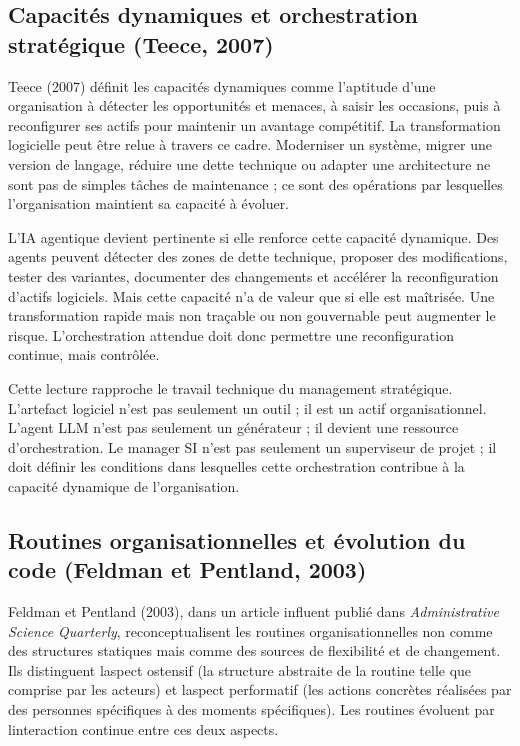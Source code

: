 \subsection{Capacit\'es dynamiques et orchestration strat\'egique (Teece, 2007)}

Teece (2007) définit les capacités dynamiques comme l'aptitude d'une organisation à détecter les opportunités et menaces, à saisir les occasions, puis à reconfigurer ses actifs pour maintenir un avantage compétitif. La transformation logicielle peut être relue à travers ce cadre. Moderniser un système, migrer une version de langage, réduire une dette technique ou adapter une architecture ne sont pas de simples tâches de maintenance ; ce sont des opérations par lesquelles l'organisation maintient sa capacité à évoluer.

L'IA agentique devient pertinente si elle renforce cette capacité dynamique. Des agents peuvent détecter des zones de dette technique, proposer des modifications, tester des variantes, documenter des changements et accélérer la reconfiguration d'actifs logiciels. Mais cette capacité n'a de valeur que si elle est maîtrisée. Une transformation rapide mais non traçable ou non gouvernable peut augmenter le risque. L'orchestration attendue doit donc permettre une reconfiguration continue, mais contrôlée.

Cette lecture rapproche le travail technique du management stratégique. L'artefact logiciel n'est pas seulement un outil ; il est un actif organisationnel. L'agent LLM n'est pas seulement un générateur ; il devient une ressource d'orchestration. Le manager SI n'est pas seulement un superviseur de projet ; il doit définir les conditions dans lesquelles cette orchestration contribue à la capacité dynamique de l'organisation.


\subsection{Routines organisationnelles et \'evolution du code (Feldman et Pentland, 2003)}

Feldman et Pentland (2003), dans un article influent publié dans
\emph{Administrative Science Quarterly}, reconceptualisent les routines
organisationnelles non comme des structures statiques mais comme des
sources de flexibilité et de changement. Ils distinguent
l\textquotesingle aspect ostensif (la structure abstraite de la routine
telle que comprise par les acteurs) et l\textquotesingle aspect
performatif (les actions concrètes réalisées par des personnes
spécifiques à des moments spécifiques). Les routines évoluent par
l\textquotesingle interaction continue entre ces deux aspects.

